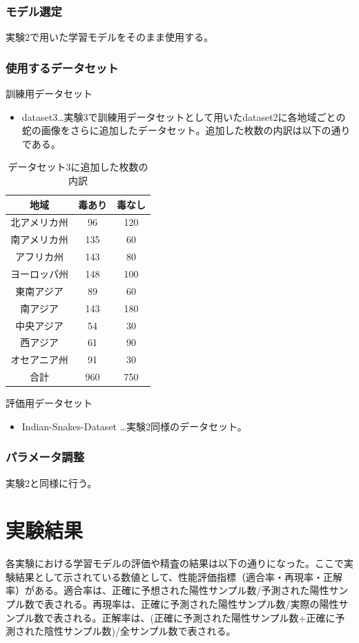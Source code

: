 \documentclass[a4paper, 11pt, titlepage]{jsarticle}
\begin{document}
\subsubsection{モデル選定}
実験2で用いた学習モデルをそのまま使用する。

\subsubsection{使用するデータセット}
訓練用データセット
\begin{itemize}
\item dataset3…実験3で訓練用データセットとして用いたdataset2に各地域ごとの蛇の画像をさらに追加したデータセット。追加した枚数の内訳は以下の通りである。
\end{itemize}\par
\begin{table}[htb]
\centering
  \caption{データセット3に追加した枚数の内訳}
  \begin{tabular}{|c|c|c|}  \hline
    地域 & 毒あり & 毒なし \\ \hline \hline
    北アメリカ州 & 96 & 120 \\ \hline
    南アメリカ州 & 135 & 60 \\ \hline
    アフリカ州 & 143 & 80 \\ \hline
    ヨーロッパ州 & 148 & 100 \\ \hline
    東南アジア & 89 & 60 \\ \hline
    南アジア & 143 & 180 \\ \hline
    中央アジア & 54 & 30 \\ \hline
    西アジア & 61 & 90 \\ \hline
    オセアニア州 & 91 & 30 \\ \hline \hline
    合計 & 960 & 750 \\ \hline
  \end{tabular}
\end{table}

評価用データセット
\begin{itemize}
\item Indian-Snakes-Dataset …実験2同様のデータセット。
\end{itemize}

\subsubsection{パラメータ調整}
実験2と同様に行う。

\section{実験結果}
各実験における学習モデルの評価や精査の結果は以下の通りになった。ここで実験結果として示されている数値として、性能評価指標（適合率・再現率・正解率）がある。適合率は、正確に予想された陽性サンプル数/予測された陽性サンプル数で表される。再現率は、正確に予測された陽性サンプル数/実際の陽性サンプル数で表される。正解率は、(正確に予測された陽性サンプル数+正確に予測された陰性サンプル数)/全サンプル数で表される。
\end{document}

